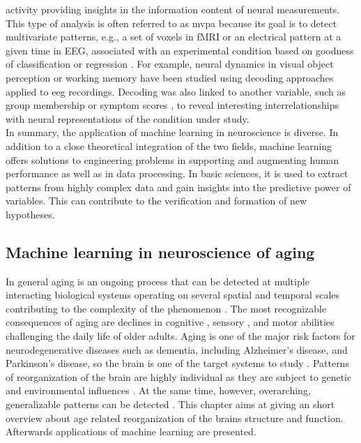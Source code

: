 activity providing insights in the information content of neural measurements. This type of analysis is often referred to as \gls{mvpa} because its goal is to detect multivariate patterns, e.g., a set of voxels in fMRI or an electrical pattern at a given time in EEG, associated with an experimental condition based on goodness of classification or regression \cite{Holdgraf2017}. For example, neural dynamics in visual object perception \cite{Cauchoix2014} or working memory \cite{Bae2018} have been studied using decoding approaches applied to \gls{eeg} recordings. Decoding was also linked to another variable, such as group membership \cite{Csizmadia2021, Bae2020} or symptom scores \cite{Coutanche2011} , to reveal interesting interrelationships with neural representations of the condition under study.\\
In summary, the application of machine learning in neuroscience is diverse. In addition to a close theoretical integration of the two fields, machine learning offers solutions to engineering problems in supporting and augmenting human performance as well as in data processing. In basic sciences, it is used to extract patterns from highly complex data and gain insights into the predictive power of variables. This can contribute to the verification and formation of new hypotheses.

\subsection{Machine learning in neuroscience of aging}
In general aging is an ongoing process that can be detected at multiple interacting biological systems operating on several spatial and temporal scales contributing to the complexity of the phenomenon \cite{Mooney2016}. The most recognizable consequences of aging are declines in cognitive \cite{}, sensory \cite{}, and motor abilities \cite{} challenging the daily life of older adults. Aging is one of the major risk factors for neurodegenerative diseases such as dementia, including Alzheimer's disease, and Parkinson's disease, so the brain is one of the target systems to study \cite{}. Patterns of reorganization of the brain are highly individual as they are subject to genetic and environmental influences \cite{Smith2020}. At the same time, however, overarching, generalizable patterns can be detected \cite{Salthouse2019}. This chapter aims at giving an short overview about age related reorganization of the brains structure and function. Afterwards applications of machine learning are presented. 

